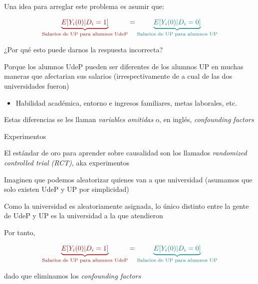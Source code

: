 \documentclass[11pt,handout,aspectratio=169]{beamer}
\newenvironment{wideitemize}{\itemize\addtolength{\itemsep}{10pt}}{\enditemize}
\begin{document}
\begin{frame}
	\begin{wideitemize}
		\item
		Una idea para arreglar este problema es asumir que: 
		
		$$ \color{red}{ \underbrace{E[ Y_i(0) | D_i=1  ] }_{\text{Salarios de UP para alumnos UdeP}}} = \color{teal}{ \underbrace{E[ Y_i(0) | D_i=0 ] }_{\text{Salarios de UP para alumnos UP}}}$$
		
		\item
		¿Por qué esto puede darnos la respuesta incorrecta? 
		
		\pause
		
		\item
		Porque los alumnos UdeP pueden ser diferentes de los alumnos UP en muchas maneras que afectarian sus salarios (irrespectivamente de a cual de las dos universidades fueron)
		
			\begin{itemize}
				\item 
				Habilidad académica, entorno e ingresos familiares, metas laborales, etc.
			\end{itemize}
		
		\item
		Estas diferencias se les llaman \textit{variables omitidas} o, en inglés, \textit{confounding factors}
	\end{wideitemize}
\end{frame}

\begin{frame}{Experimentos}
\begin{wideitemize}
\item
El estándar de oro para aprender sobre causalidad son los llamados  \textit{randomized controlled trial (RCT)}, aka experimentos

\item
Imaginen que podemos aleatorizar quienes van a que universidad (asumamos que solo existen UdeP y UP por simplicidad)

\item
Como la universidad es aleatoriamente asignada, lo único distinto entre la gente de UdeP y UP es la universidad a la que atendieron

\item
Por tanto, 

		$$ \color{red}{ \underbrace{E[ Y_i(0) | D_i=1  ] }_{\text{Salarios de UP para alumnos UdeP}}} = \color{teal}{ \underbrace{E[ Y_i(0) | D_i=0 ] }_{\text{Salarios de UP para alumnos UP}}}$$
		
		dado que eliminamos los \textit{confounding factors}


\end{wideitemize}
\end{frame}
\end{document}
